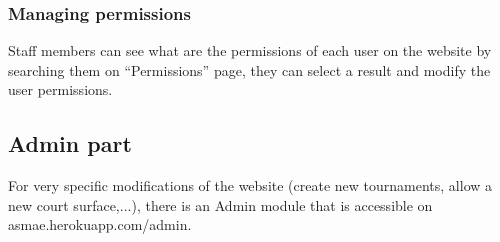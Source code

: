 \subsubsection{Managing permissions}

Staff members can see what are the permissions of each user on the website by searching them on \enquote{Permissions} page, they can select a result and modify the user permissions.

\subsection{Admin part}

For very specific modifications of the website (create new tournaments, allow a new court surface,...), there is an Admin module that is accessible on asmae.herokuapp.com/admin.